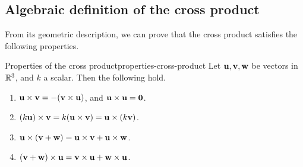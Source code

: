 \subsection{Algebraic definition of the cross product}

From its geometric description, we can prove that the cross product
satisfies the following properties.

\begin{proposition}{Properties of the cross product}{properties-cross-product}
  Let $\mbox{\bf u}, \mbox{\bf v}, \mbox{\bf w}$ be vectors in $\mathbb{R}^3$, and $k$ a
  scalar. Then the following hold.%
  \begin{enumerate}
  \item
    $\mbox{\bf u}\times \mbox{\bf v}= -(\mbox{\bf v}\times \mbox{\bf u})$,
    and $\mbox{\bf u}\times \mbox{\bf u}=\mbox{\bf 0}$.
  \item $(k \mbox{\bf u})\times \mbox{\bf v}= k (\mbox{\bf u}\times \mbox{\bf v})
    =\mbox{\bf u}\times (k \mbox{\bf v})$.
  \item $\mbox{\bf u}\times (\mbox{\bf v}+\mbox{\bf w}) =\mbox{\bf u}\times \mbox{\bf v}+\mbox{\bf u}\times \mbox{\bf w}$.
  \item $(\mbox{\bf v}+\mbox{\bf w}) \times \mbox{\bf u}=\mbox{\bf v} \times \mbox{\bf u}+\mbox{\bf w}\times \mbox{\bf u}$.
  \end{enumerate}
\end{proposition}

